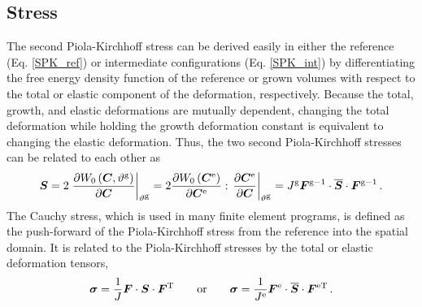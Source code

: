 \documentclass[10pt,letterpaper,oneside]{report}
\newcommand{\ten}[1]{\mbox{\boldmath $#1$}{}}
\newcommand{\scas}[1]{\mbox{{\scriptsize{${\rm{#1}}$}}}{}}
\begin{document}
\begin{itemize}
\section{Stress}
The second Piola-Kirchhoff stress can be derived easily in either the reference (Eq. \ref{SPK_ref}) or intermediate configurations (Eq. \ref{SPK_int}) by differentiating the free energy density function of the reference or grown volumes with respect to the total or elastic component of the deformation, respectively.  Because the total, growth, and elastic deformations are mutually dependent, changing the total deformation while holding the growth deformation constant is equivalent to changing the elastic deformation.  Thus, the two second Piola-Kirchhoff stresses can be related to each other as
\begin{equation}
\ten{S} = 2 \left. \frac{\partial W_0 \left( \ten{C}, \vartheta^{\scas{g}} \right) }{\partial \ten{C}} \right|_{\vartheta^{\scas{g}}} = 2 \frac{\partial W_0 \left( \ten{C}^{\scas{e}}\right) }{\partial \ten{C}^{\scas{e}}} : \left. \frac{\partial \ten{C}^{\scas{e}}}{\partial \ten{C}} \right|_{\vartheta^{\scas{g}}} = J^{\scas{g}} \ten{F}^{\scas{g}-1} \cdot \overline{\ten{S}} \cdot \ten{F}^{\scas{g}-1} \, . 
\end{equation}
The Cauchy stress, which is used in many finite element programs, is defined as the push-forward of the Piola-Kirchhoff stress from the reference into the spatial domain.  It is related to the Piola-Kirchhoff stresses by the total or elastic deformation tensors, 
\begin{equation}
\ten{\sigma} = \frac{1}{J} \ten{F} \cdot \ten{S} \cdot \ten{F}^{\scas{T}}  
\qquad \mbox{or} \qquad   
\ten{\sigma} = \frac{1}{J^{\scas{e}}} \ten{F}^{\scas{e}} \cdot \overline{\ten{S}} \cdot \ten{F}^{\scas{eT}} \, .
\end{equation}

\end{itemize}
\end{document}
